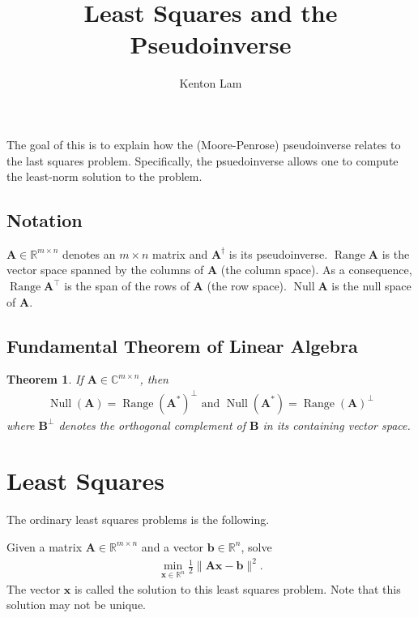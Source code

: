 \documentclass[12pt,a4paper]{article} %
\title{Least Squares and the Pseudoinverse}
\author{Kenton Lam}
\newtheorem*{theorem}{Theorem}
\DeclareMathOperator{\Range}{Range}
\DeclareMathOperator{\Null}{Null}
\begin{document}
\maketitle

The goal of this is to explain how the (Moore-Penrose) pseudoinverse relates 
to the last squares problem. Specifically, the psuedoinverse allows one to 
compute the least-norm solution to the problem.

\subsection*{Notation}
$\mathbf A \in \mathbb R^{m \times n}$ denotes an $m \times n$ matrix 
and $\mathbf A^\dagger$ is its pseudoinverse. $\Range \mathbf A$ is the vector space 
spanned by the columns of $\mathbf A$ (the column space). As a consequence, $\Range \mathbf A^\top$ is 
the span of the rows of $\mathbf A$ (the row space). $\Null \mathbf A$ is the null space of $\mathbf A$.

\subsection*{Fundamental Theorem of Linear Algebra}
\begin{theorem}
    If $\mathbf A \in \mathbb C^{m \times n}$, then 
    \begin{align*}
        \Null (\mathbf A) = \Range (\mathbf A^*)^\perp \text{ and }
        \Null (\mathbf A^*) = \Range(\mathbf A)^\perp
    \end{align*}
    where $\mathbf B^\perp$ denotes the orthogonal complement of $\mathbf B$ in its 
    containing vector space.
\end{theorem}

\section{Least Squares}
The ordinary least squares problems is the following.

Given a matrix $\mathbf A \in \mathbb R^{m \times n}$ 
and a vector $\bm b \in \mathbb R^{n}$, solve
\begin{align*}
    \min_{\bm x \in \mathbb R^n} \frac{1}{2} \| \mathbf A \bm x - \bm b \| ^2.
\end{align*}
The vector $\bm x$ is called the solution to this least squares problem. Note that this 
solution may not be unique.
\end{document}
